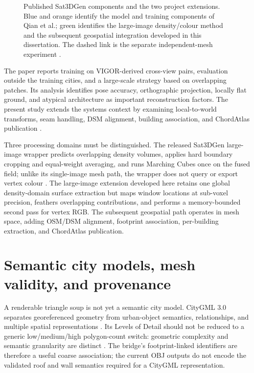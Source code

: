 \begin{figure}[H]
{%
}
\caption{Published Sat3DGen components and the two project extensions.  Blue
and orange identify the model and training components of Qian et al.; green
identifies the large-image density/colour method and the subsequent geospatial
integration developed in this dissertation.  The dashed link is the separate
independent-mesh experiment \cite{qian2026sat3dgen}.}
\label{fig:sat3dgen-model}
\end{figure}

The paper reports training on VIGOR-derived cross-view pairs, evaluation
outside the training cities, and a large-scale strategy based on overlapping
patches.  Its analysis identifies pose accuracy, orthographic projection,
locally flat ground, and atypical architecture as important reconstruction
factors.  The present study extends the systems context by examining
local-to-world transforms, seam handling, DSM alignment, building association,
and ChordAtlas publication \cite{qian2026sat3dgen}.

Three processing domains must be distinguished.  The released Sat3DGen
large-image wrapper predicts overlapping density volumes, applies hard boundary
cropping and equal-weight averaging, and runs Marching Cubes once on the fused
field; unlike its single-image mesh path, the wrapper does not query or export
vertex colour \cite{qian2026sat3dgen,qianSat3DGenCode2026}.  The large-image
extension developed here retains one global density-domain surface extraction
but maps window locations at sub-voxel precision, feathers overlapping
contributions, and performs a memory-bounded second pass for vertex RGB.  The
subsequent geospatial path operates in mesh space, adding OSM/DSM alignment,
footprint association, per-building extraction, and ChordAtlas publication.

\section{Semantic city models, mesh validity, and provenance}

A renderable triangle soup is not yet a semantic city model.  CityGML 3.0
separates georeferenced geometry from urban-object semantics, relationships,
and multiple spatial representations \cite{ogcCityGML3}.  Its Levels of Detail
should not be reduced to a generic low/medium/high polygon-count switch:
geometric complexity and semantic granularity are distinct
\cite{biljecki2016lod}.  The bridge's footprint-linked identifiers are therefore a
useful coarse association; the current OBJ outputs do not encode the validated
roof and wall semantics required for a CityGML representation.

